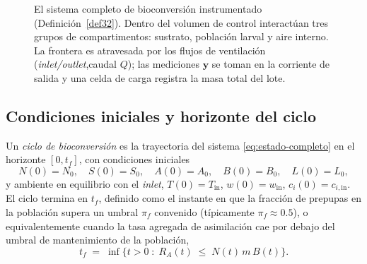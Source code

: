 \begin{figure}[htbp]
\caption{El sistema completo de bioconversión instrumentado
(Definición~\ref{def32}). Dentro del volumen de control interactúan tres
grupos de compartimentos: sustrato, población larval y aire interno. La
frontera es atravesada por los flujos de ventilación (\emph{inlet/outlet},caudal $Q$); las mediciones $\mathbf{y}$ se toman en
la corriente de salida y una celda de carga registra la masa total del lote.}
\label{fig:sistema-completo}
\end{figure}

\subsection{Condiciones iniciales y horizonte del ciclo}

\begin{definition}\label{def33}
Un \emph{ciclo de bioconversión} es la trayectoria del sistema
\eqref{eq:estado-completo} en el horizonte $[0, t_f]$, con condiciones
iniciales
\begin{equation}
N(0) = N_0, \quad S(0) = S_0, \quad
A(0) = A_0, \quad B(0) = B_0, \quad L(0) = L_0,
\label{eq:cond-iniciales}
\end{equation}
y ambiente en equilibrio con el \emph{inlet},
$T(0) = T_{\mathrm{in}}$, $w(0) = w_{\mathrm{in}}$,
$c_i(0) = c_{i,\mathrm{in}}$. El ciclo termina en $t_f$, definido como el
instante en que la fracción de prepupas en la población supera un umbral
$\pi_f$ convenido (típicamente $\pi_f \approx 0.5$), o equivalentemente
cuando la tasa agregada de asimilación cae por debajo del umbral de
mantenimiento de la población,
\begin{equation}
t_f \;=\; \inf\bigl\{ t > 0 \;:\; R_A(t) \;\leq\; N(t)\,m\,B(t) \bigr\}.
\label{eq:tf}
\end{equation}
\end{definition}

